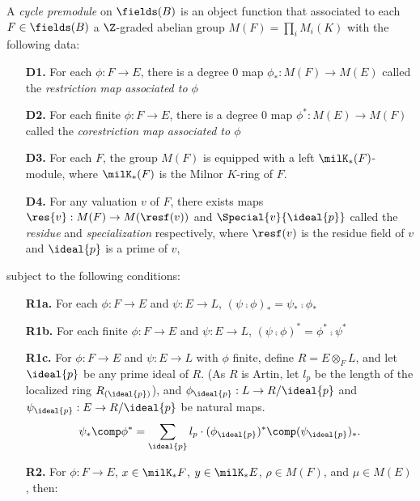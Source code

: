 \begin{defn}\label{def_pre_cycmod}
A \emph{cycle premodule} on $\fields(B)$ is an object function
that associated to each $F \in \fields(B)$ a $\Z$-graded abelian
group $M(F) = \prod_i M_i(K)$ with the following data:

\begin{enumerate}
\item[\textbf{D1.}] For each $\phi: F \to E$, there is a degree 0
map $\phi_*: M(F) \to M(E)$ called the \emph{restriction map 
associated to $\phi$}

\item[\textbf{D2.}] For each finite $\phi: F \to E$, there is a 
degree 0 map $\phi^*: M(E) \to M(F)$ called the \emph{corestriction
map associated to $\phi$}

\item[\textbf{D3.}] For each $F$, the group $M(F)$ is equipped
with a left $\milK_*(F)$-module, where $\milK_*(F)$ is the Milnor
$K$-ring of $F$.

\item[\textbf{D4.}] For any valuation $v$ of $F$, there exists 
maps $\res{v}: M(F) \to M(\resf(v))$ and $\Special{v}{\ideal{p}}$
called the \emph{residue} and \emph{specialization} respectively, 
where $\resf(v)$ is the residue field of $v$ and $\ideal{p}$ is 
a prime of $v$,
\end{enumerate}

subject to the following conditions:

\begin{enumerate}
\item[\textbf{R1a.}] For each $\phi: F \to E$ and $\psi: E \to L$,
$(\psi \comp \phi)_* = \psi_* \comp \phi_*$

\item[\textbf{R1b.}] For each finite $\phi: F \to E$ and $\psi: E
\to L$, $(\psi \comp \phi)^* = \phi^* \comp \psi^*$

\item[\textbf{R1c.}] For $\phi: F \to E$ and $\psi: E \to L$ with
$\phi$ finite, define $R = E \otimes_F L$, and let $\ideal{p}$
be any prime ideal of $R$. (As $R$ is Artin, let $l_p$ be the 
length of the localized ring $R_{(\ideal{p})}$), and 
$\phi_{\ideal{p}}: L \to R/{\ideal{p}}$ and 
$\psi_{\ideal{p}}: E \to R/{\ideal{p}}$ be natural maps.
\[
\psi_*\comp \phi^* = \sum_{\ideal{p}} l_p \cdot 
(\phi_{\ideal{p}})^* \comp (\psi_{\ideal{p}})_*.
\]

\item[\textbf{R2.}] For $\phi: F \to E$, $x \in \milK_*F$, $y \in
\milK_*E$, $\rho \in M(F)$, and $\mu \in M(E)$, then:


\end{enumerate}
\end{defn}
